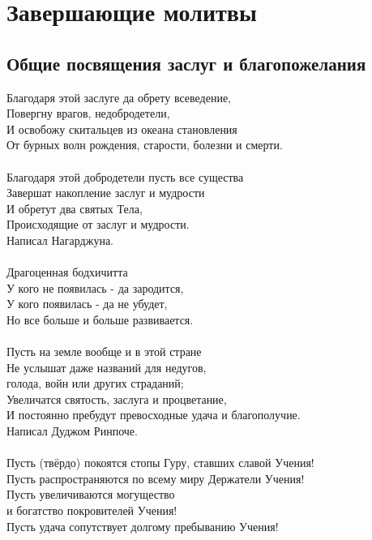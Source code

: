 
\section{Завершающие молитвы}

\subsection{Общие посвящения заслуг и благопожелания}

Благодаря этой заслуге да обрету всеведение,\\
Повергну врагов, недобродетели,\\
И освобожу скитальцев из океана становления \\
От бурных волн рождения, старости, болезни и смерти.\\
\\
Благодаря этой добродетели пусть все существа\\
Завершат накопление заслуг и мудрости \\
И обретут два святых Тела,\\
Происходящие от заслуг и мудрости.\\
\scriptsize
Написал Нагарджуна.\\
\normalsize
\\
Драгоценная бодхичитта\\
У кого не появилась - да зародится,\\
У кого появилась - да не убудет,\\
Но все больше и больше развивается.\\
\\
Пусть на земле вообще и в этой стране\\
Не услышат даже названий для недугов, \\ \indent голода, войн или других страданий;\\
Увеличатся святость, заслуга и процветание,\\
И постоянно пребудут превосходные удача и благополучие.\\
\scriptsize
Написал Дуджом Ринпоче.\\
\normalsize
\\
Пусть (твёрдо) покоятся стопы Гуру, ставших славой Учения!\\
Пусть распространяются по всему миру Держатели Учения!\\
Пусть увеличиваются могущество \\ \indent и богатство покровителей Учения!\\
Пусть удача сопутствует долгому пребыванию Учения!\\
\\

